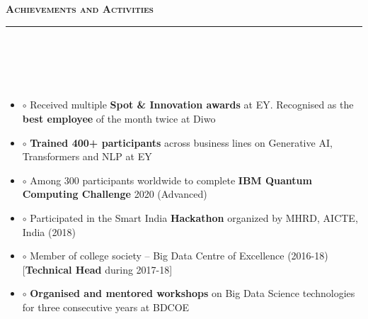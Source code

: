 \documentclass[a4paper,10pt]{article}
\newcommand{\lsep}{-0.5cm}
\newcommand{\resheading}[1]{{\small
        {
            \begin{minipage}
                {0.992\textwidth}\textbf{{\textsc{#1 \vphantom{p\^{E}} }}}
                \\[-0.3cm]
                \hrule
            \end{minipage}
            \\[-0.5cm]
        }
 }}
\begin{document}
\vspace{4pt}
\noindent
\resheading{\textbf{\large Achievements and Activities}}\\[\lsep] 
\\[-0.2cm]
    \begin{itemize}
    
    \item[] $\circ$  \hspace{0.0cm} Received multiple \textbf{Spot \& Innovation awards} at EY. Recognised as the \textbf{best employee} of the month twice at Diwo \\[-0.55cm]
    
    \item[] $\circ$  \hspace{0.0cm} \textbf{Trained 400+ participants} across business lines on Generative AI, Transformers and NLP at EY  \\[-0.55cm]
    
    \item[] $\circ$  \hspace{0.0cm} Among 300 participants worldwide to complete \textbf{IBM Quantum Computing Challenge} 2020 (Advanced) \\[-0.55cm]
    
    \item[] $\circ$  \hspace{0.0cm} Participated in the Smart India \textbf{Hackathon} organized by MHRD, AICTE, India (2018) \\[-0.55cm]
    
    \item[] $\circ$  \hspace{0.0cm} Member of college society -- Big Data Centre of Excellence (2016-18) [\textbf{Technical Head} during  2017-18] \\[-0.55cm]
    
    \item[] $\circ$  \hspace{0.0cm} \textbf{Organised and mentored workshops} on Big Data Science technologies for three consecutive years at BDCOE \\[-0.55cm]
    	
    \end{itemize}
\end{document}
